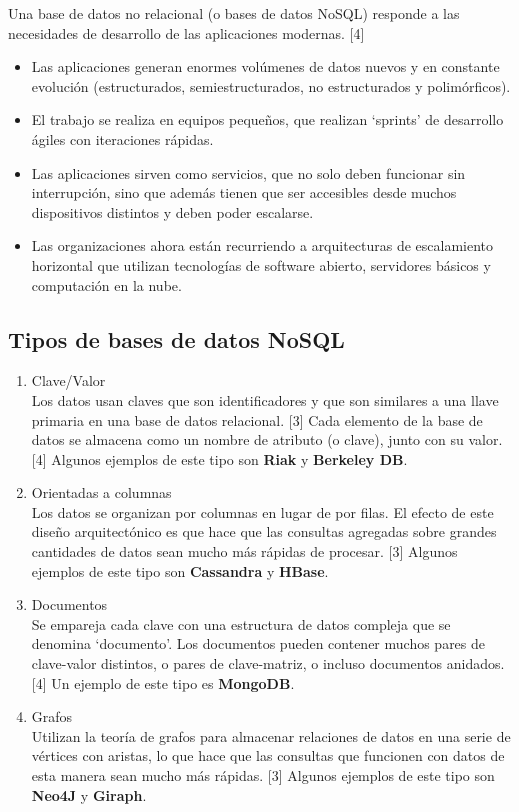 \documentclass[twocolumn]{article}
\begin{document}
Una base de datos no relacional (o bases de datos NoSQL) responde a las necesidades de desarrollo de las aplicaciones modernas. [4]

\begin{itemize}
  \item Las aplicaciones generan enormes volúmenes de datos nuevos y en constante evolución (estructurados, semiestructurados, no estructurados y polimórficos).
  \item El trabajo se realiza en equipos pequeños, que realizan `sprints' de desarrollo ágiles con iteraciones rápidas.
  \item Las aplicaciones sirven como servicios, que no solo deben funcionar sin interrupción, sino que además tienen que ser accesibles desde muchos dispositivos distintos y deben poder escalarse.
  \item Las organizaciones ahora están recurriendo a arquitecturas de escalamiento horizontal que utilizan tecnologías de software abierto, servidores básicos y computación en la nube.
\end{itemize}

\subsection{Tipos de bases de datos NoSQL}

\begin{enumerate}

  \item Clave/Valor \\
        Los datos usan claves que son identificadores y que son similares a una llave primaria en una base de datos relacional. [3] Cada elemento de la base de datos se almacena como un nombre de atributo (o clave), junto con su valor. [4] Algunos ejemplos de este tipo son \textbf{Riak } y \textbf{Berkeley DB}.

  \item Orientadas a columnas \\
        Los datos se organizan por columnas en lugar de por filas. El efecto de este diseño arquitectónico es que hace que las consultas agregadas sobre grandes cantidades de datos sean mucho más rápidas de procesar. [3] Algunos ejemplos de este tipo son \textbf{Cassandra} y \textbf{HBase}.

  \item Documentos \\
        Se empareja cada clave con una estructura de datos compleja que se denomina `documento'. Los documentos pueden contener muchos pares de clave-valor distintos, o pares de clave-matriz, o incluso documentos anidados. [4] Un ejemplo de este tipo es \textbf{MongoDB}.

  \item Grafos \\
        Utilizan la teoría de grafos para almacenar relaciones de datos en una serie de vértices con aristas, lo que hace que las consultas que funcionen con datos de esta manera sean mucho más rápidas. [3] Algunos ejemplos de este tipo son \textbf{Neo4J} y \textbf{Giraph}.

\end{enumerate}
\end{document}
